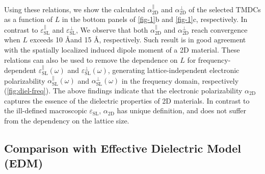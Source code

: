 %
%
Using these relations, we show the calculated
$\alpha_{\mathrm{2D}}^{\parallel}$ and $\alpha_{\mathrm{2D}}^{\perp}$
of the selected TMDCs as a function of $L$ in the bottom panels of
 \autoref{fig-1}b and \autoref{fig-1}c, respectively.  In contrast to
$\varepsilon_{\mathrm{SL}}^{\parallel}$ and
$\varepsilon_{\mathrm{SL}}^{\perp}$, We observe that both
$\alpha_{\mathrm{2D}}^{\parallel}$ and $\alpha_{\mathrm{2D}}^{\perp}$
reach convergence when $L$ exceeds 10 \AA and 15 \AA,
respectively. Such result is in good agreement with the spatially
localized induced dipole moment of a 2D material.
%
%
These relations can also be used to remove the dependence on $L$ for
frequency-dependent $\varepsilon^{\parallel}_{\mathrm{SL}}(\omega)$
and $\varepsilon^{\perp}_{\mathrm{SL}}(\omega)$, generating
lattice-independent electronic polarizability
$\alpha^{\parallel}_{\mathrm{SL}}(\omega)$ and
$\alpha^{\perp}_{\mathrm{SL}}(\omega)$ in the frequency domain,
respectively (\autoref{fig:diel-freq}).
%
% 
% 
% 
% 
The above findings indicate that the electronic polarizability
$\alpha_{\mathrm{2D}}$ captures the essence of the dielectric
properties of 2D materials. In contrast to the ill-defined macroscopic
$\varepsilon_{\mathrm{SL}}$, $\alpha_{\mathrm{2D}}$ has unique
definition, and does not suffer from the dependency on the lattice
size.

\subsection{Comparison with Effective Dielectric Model (EDM)}
\label{sec:diel-comp-with-effect}

